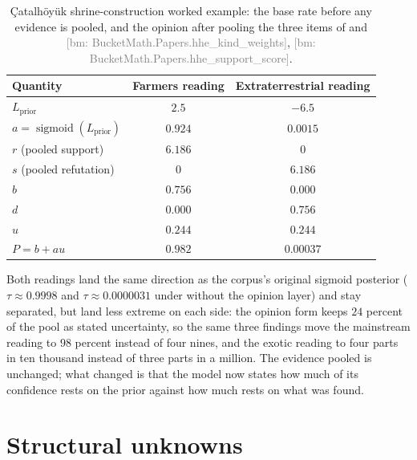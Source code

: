 \documentclass[11pt]{article}
\newcommand{\bm}[1]{\textcolor{gray}{\footnotesize [bm: #1]}}
\begin{document}
\begin{table}[htbp]
  \centering
  \caption{Çatalhöyük shrine-construction worked example: the base rate
    before any evidence is pooled, and the opinion after pooling the
    three items of  and 
    \bm{BucketMath.Papers.hhe\_kind\_weights}, \bm{BucketMath.Papers.hhe\_support\_score}.}
  \label{tab:worked-example}
  \begin{tabular}{@{}lcc@{}}
    \toprule
    Quantity & Farmers reading & Extraterrestrial reading \\
    \midrule
    $L_{\mathrm{prior}}$        & $2.5$    & $-6.5$    \\
    $a = \operatorname{sigmoid}(L_{\mathrm{prior}})$ & $0.924$  & $0.0015$  \\
    $r$ (pooled support)        & $6.186$  & $0$       \\
    $s$ (pooled refutation)     & $0$      & $6.186$   \\
    $b$                          & $0.756$  & $0.000$   \\
    $d$                          & $0.000$  & $0.756$   \\
    $u$                          & $0.244$  & $0.244$   \\
    $P = b + a u$                & $0.982$  & $0.00037$ \\
    \bottomrule
  \end{tabular}
\end{table}

Both readings land the same direction as the corpus's original sigmoid
posterior ($\tau \approx 0.9998$ and $\tau \approx 0.0000031$ under
 without the opinion layer) and stay separated, but land
less extreme on each side: the opinion form keeps $24$ percent of the
pool as stated uncertainty, so the same three findings move the
mainstream reading to $98$ percent instead of four nines, and the exotic
reading to four parts in ten thousand instead of three parts in a
million. The evidence pooled is unchanged; what changed is that the model
now states how much of its confidence rests on the prior against how much
rests on what was found.

\section{Structural unknowns}
\label{sec:unknowns}
\end{document}
